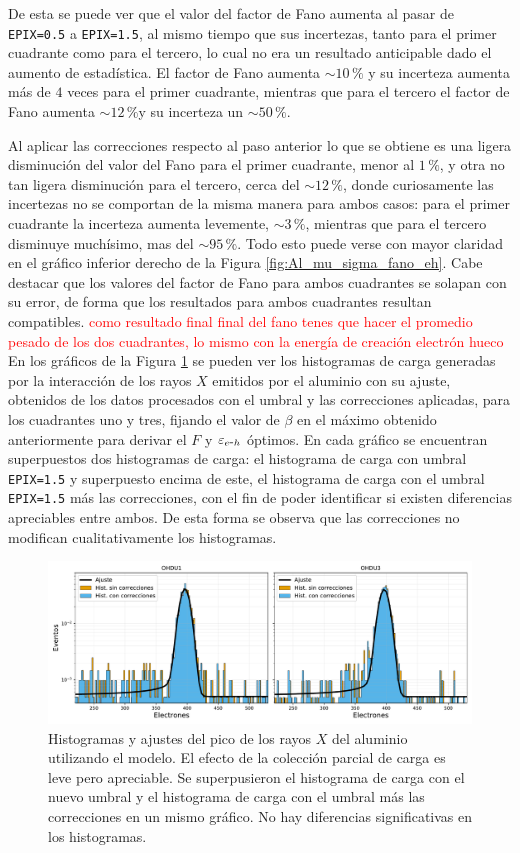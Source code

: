 De esta se puede ver que el valor del factor de Fano aumenta al pasar de \verb|EPIX=0.5| a \verb|EPIX=1.5|, al mismo tiempo que sus incertezas, tanto para el primer cuadrante como para el tercero, lo cual no era un resultado anticipable dado el aumento de estadística. El factor de Fano aumenta $\sim 10\,\%$ y su incerteza aumenta más de $4$ veces para el primer cuadrante, mientras que para el tercero el factor de Fano aumenta $\sim 12\,\%$y su incerteza un $\sim 50\,\%$.

Al aplicar las correcciones respecto al paso anterior lo que se obtiene es una ligera disminución del valor del Fano para el primer cuadrante, menor al $1\,\%$, y otra no tan ligera disminución para el tercero, cerca del $\sim 12\,\%$, donde curiosamente las incertezas no se comportan de la misma manera para ambos casos: para el primer cuadrante la incerteza aumenta levemente, $\sim 3\,\%$, mientras que para el tercero disminuye muchísimo, mas del $\sim 95\,\%$. Todo esto puede verse con mayor claridad en el gráfico inferior derecho de la Figura \ref{fig:Al_mu_sigma_fano_eh}. Cabe destacar que los valores del factor de Fano para ambos cuadrantes se solapan con su error, de forma que los resultados para ambos cuadrantes resultan compatibles.
\textcolor{red}{como resultado final final del fano tenes que hacer el promedio pesado de los dos cuadrantes, lo mismo con la energía de creación electrón hueco} 
En los gráficos de la Figura \ref{fig:Al_OHDU1y3_EPIX15_Corr} se pueden ver los histogramas de carga generadas por la interacción de los rayos $X$ emitidos por el aluminio con su ajuste, obtenidos de los datos procesados con el umbral y las correcciones aplicadas, para los cuadrantes uno y tres, fijando el valor de $\beta$ en el máximo obtenido anteriormente para derivar el $F$ y $\varepsilon_{e\mbox{-}h}$ óptimos. En cada gráfico se encuentran superpuestos dos histogramas de carga: el histograma de carga con umbral \verb|EPIX=1.5| y superpuesto encima de este, el histograma de carga con el umbral \verb|EPIX=1.5| más las correcciones, con el fin de poder identificar si existen diferencias apreciables entre ambos. De esta forma se observa que las correcciones no modifican cualitativamente los histogramas.
\begin{figure}[h]
    \centering
        \includegraphics[scale=0.5]{Figs/Al_hists_ohdu1y3_dobles.pdf}
    \caption{Histogramas y ajustes del pico de los rayos $X$ del aluminio utilizando el modelo. El efecto de la colección parcial de carga es leve pero apreciable. Se superpusieron el histograma de carga con el nuevo umbral y el histograma de carga con el umbral más las correcciones en un mismo gráfico. No hay diferencias significativas en los histogramas.}
    \label{fig:Al_OHDU1y3_EPIX15_Corr}
\end{figure}
